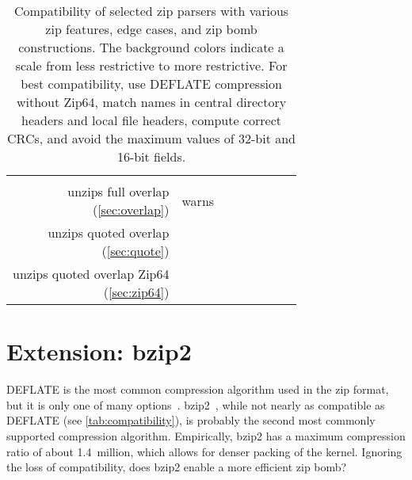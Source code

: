 \documentclass[letterpaper,twocolumn,10pt]{article}
\newcommand{\yes}{\cellcolor{ycolor}\checkmark}
\newcommand{\maybe}[1]{\cellcolor{mcolor}#1}
\newcommand{\no}{\cellcolor{ncolor}\ding{55}}
\begin{document}
\begin{table*}
\begin{tabular}{rccccccc}
\href{https://github.com/jbangert/nail/blob/4bd9cc29c4092abe7a77f8294aff2337bba02ec5/examples/zip/zip.nail#L79}{\yes} &
\href{https://android.googlesource.com/platform/system/core/+/refs/tags/android-9.0.0_r1/libziparchive/zip_archive_common.h#51}{\yes} &
\href{https://github.com/madler/sunzip/blob/master/sunzip.c#L1139}{\yes}
\\
\noalign{\vspace{0.5em}}
\thead[r]{unzips full overlap\\(\autoref{sec:overlap})} &
\maybe{warns} &
\no &
\yes &
\yes &
\yes &
\no &
\no
\\
\thead[r]{unzips quoted overlap\\(\autoref{sec:quote})} &
\yes &
\yes &
\yes &
\yes &
\yes &
\yes &
\no
\\
\thead[r]{unzips quoted overlap Zip64\\(\autoref{sec:zip64})} &
\yes &
\yes &
\yes &
\yes &
\no &
\no &
\no
\end{tabular}
\caption{
Compatibility of selected zip parsers with various zip features,
edge cases,
and zip bomb constructions.
The background colors indicate a scale from \colorbox{ycolor}{less restrictive} to \colorbox{ncolor}{more restrictive}.
For best compatibility,
use DEFLATE compression without Zip64,
match names in central directory headers and local file headers,
compute correct CRCs,
and avoid the maximum values of 32-bit and 16-bit fields.
}
\label{tab:compatibility}
\end{table*}


\section{Extension: bzip2}
\label{sec:bzip2}

DEFLATE is the most common compression algorithm
used in the zip format, but it is only one of many options~\cite[\S 4.4.5]{appnote}.
bzip2~\cite{bzip2}, while not nearly as compatible as DEFLATE (see \autoref{tab:compatibility}),
is probably the second most commonly supported compression algorithm.
Empirically, bzip2 has a maximum compression ratio of about 1.4~million,
which allows for denser packing of the kernel.
Ignoring the loss of compatibility,
does bzip2 enable a more efficient zip bomb?

\end{document}
